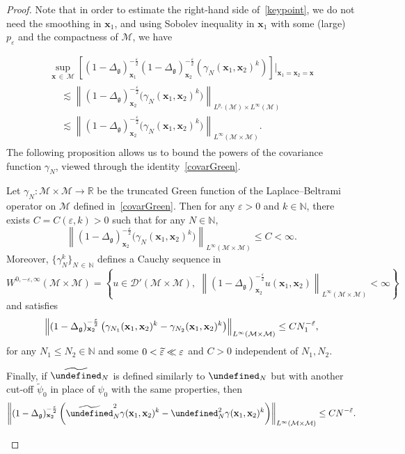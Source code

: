 \documentclass[AHL,Unicode,longabstracts,published]{cedram}
\newcommand{\R}{\mathbb{R}}
\newcommand{\N}{\mathbb{N}}
\let\P= \undefined
\newcommand{\P}{\mathbf{P}}
\newcommand{\x}{\mathbf{x}}
\newcommand{\Dp}{\mathcal{D}'}
\newcommand{\M}{\mathcal{M}}
\newcommand{\g}{\mathfrak{g}}
\newcommand{\Dlg}{\Delta_{\g}}
\newcommand{\eps}{\varepsilon}
\newcommand{\wt}{\widetilde}
\newcommand{\les}{\lesssim}
\let\oldtilde\tilde
\renewcommand*{\tilde}[1]{\mathchoice{\widetilde{#1}}{\widetilde{#1}}{\oldtilde{#1}}{\oldtilde{#1}}}
\begin{document}
\begin{proof}
Note that in order to estimate the right-hand side of~\eqref{keypoint}, we do not need the smoothing in $\x_1$, and using Sobolev inequality in $\x_1$ with some (large) $p_{\eps}$ and the compactness of $\M$, we have

\begin{multline}\label{rk-gamma}
\sup_{\x\,\in\,\M}\left[(1-\Dlg)_{\x_1}^{-\frac\eps2}(1-\Dlg)_{\x_2}^{-\frac\eps2}\left(\gamma_N(\x_1,\x_2)^k\right)\right]\Big|_{\x_1=\x_2=\x}\\
\begin{aligned}
& \les \left\|(1-\Dlg)_{\x_2}^{-\frac\eps2}\big(\gamma_N(\x_1,\x_2)^k\big)\right\|_{L^{p_\eps}(\M)\times L^{\infty}(\M)}
\\
&\les \left\|(1-\Dlg)_{\x_2}^{-\frac\eps2}\big(\gamma_N(\x_1,\x_2)^k\big)\right\|_{L^{\infty}(\M\times\M)}.
\end{aligned}
\end{multline}
The following proposition allows us to bound the powers of the covariance function $\gamma_N$, viewed through the identity~\eqref{covarGreen}.

\begin{prop}\label{prop-Green}
Let $\gamma_N: \M\times\M\rightarrow\R$ be the truncated Green function of the Laplace--Beltrami operator on $\M$ defined in~\eqref{covarGreen}. Then for any $\eps>0$ and $k\in\N$, there exists $C=C(\eps,k)>0$ such that for any $N\in\N$,
\begin{equation}\label{estim-Green}
\left\|(1-\Dlg)_{\x_2}^{-\frac\eps2}\big(\gamma_N(\x_1,\x_2)^k\big)\right\|_{L^{\infty}(\M\times\M)} \leq C<\infty.
\end{equation}
Moreover, $\{\gamma_N^k\}_{N\,\in\,\N}$ defines a Cauchy sequence in
\begin{equation*}
W^{0,-\eps,\infty}(\M\times\M)=\left\{u\in\Dp(\M\times\M),\;\left\|(1-\Dlg)_{\x_2}^{-\frac\eps2}u(\x_1,\x_2)\right\|_{L^{\infty}(\M\times\M)}<\infty\right\}
\end{equation*}
and satisfies
\begin{equation}\label{estim-Green-diff}
\left\|(1-\Dlg)_{\x_2}^{-\frac\eps2}\left(\gamma_{N_1}(\x_1,\x_2)^k-\gamma_{N_2}(\x_1,\x_2)^k\right)\right\|_{L^{\infty}(\M\times\M)} \leq CN_1^{-\tilde{\eps}},
\end{equation}
for any $N_1\leq N_2\in\N$ and some $0<\tilde{\eps}\ll\eps$ and $C>0$ independent of $N_1,N_2$.

Finally, if $\wt\P_N$ is defined similarly to $\P_N$ but with another cut-off $\wt\psi_0$ in place of $\psi_0$ with the same properties, then
\begin{equation}\label{estim-Green-diff2}
\left\|(1-\Dlg)_{\x_2}^{-\frac\eps2}\left(\wt\P_N^2\gamma(\x_1,\x_2)^k-\P_N^2\gamma(\x_1,\x_2)^k\right)\right\|_{L^{\infty}(\M\times\M)} \leq CN^{-\tilde{\eps}}.
\end{equation}
\end{prop}


\end{proof}
\end{document}
